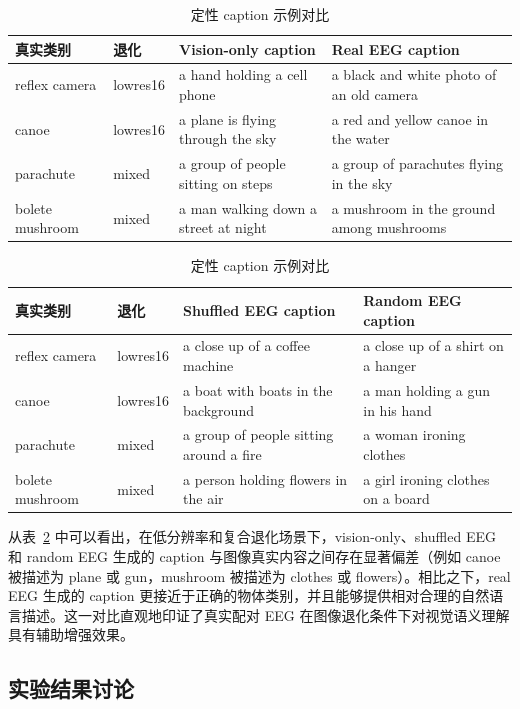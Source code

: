 \begin{table}[htbp]
  \centering
  \caption{定性 caption 示例对比}
  \label{tab:qualitative}
  \begin{tabularx}{\linewidth}{l l X X}
    \toprule
    真实类别 & 退化 & Vision-only caption & Real EEG caption \\
    \midrule
    reflex camera & lowres16 & a hand holding a cell phone & a black and white photo of an old camera \\
    canoe & lowres16 & a plane is flying through the sky & a red and yellow canoe in the water \\
    parachute & mixed & a group of people sitting on steps & a group of parachutes flying in the sky \\
    bolete mushroom & mixed & a man walking down a street at night & a mushroom in the ground among mushrooms \\
    \bottomrule
  \end{tabularx}

  \vspace{4pt}
  \begin{tabularx}{\linewidth}{l l X X}
    \toprule
    真实类别 & 退化 & Shuffled EEG caption & Random EEG caption \\
    \midrule
    reflex camera & lowres16 & a close up of a coffee machine & a close up of a shirt on a hanger \\
    canoe & lowres16 & a boat with boats in the background & a man holding a gun in his hand \\
    parachute & mixed & a group of people sitting around a fire & a woman ironing clothes \\
    bolete mushroom & mixed & a person holding flowers in the air & a girl ironing clothes on a board \\
    \bottomrule
  \end{tabularx}
\end{table}

从表~\ref{tab:qualitative} 中可以看出，在低分辨率和复合退化场景下，vision-only、shuffled EEG 和 random EEG 生成的 caption 与图像真实内容之间存在显著偏差（例如 canoe 被描述为 plane 或 gun，mushroom 被描述为 clothes 或 flowers）。相比之下，real EEG 生成的 caption 更接近于正确的物体类别，并且能够提供相对合理的自然语言描述。这一对比直观地印证了真实配对 EEG 在图像退化条件下对视觉语义理解具有辅助增强效果。

\subsection{实验结果讨论}

